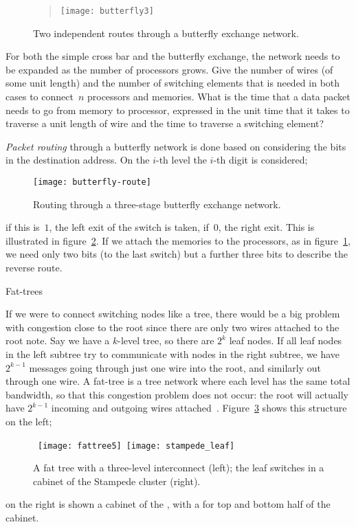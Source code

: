 \begin{figure}[ht]
  \begin{quote}
  \texttt{[image: butterfly3]}
  \end{quote}
  \caption{Two independent routes through a butterfly exchange network.}
  \label{fig:butterflyroute}
\end{figure}

\begin{exercise}
For both the simple cross bar and the butterfly
exchange, the network needs to be expanded as the number of processors grows. 
Give the number of wires (of some unit length) and the number of switching
elements that is needed in both cases to connect~$n$ processors and memories. 
What is the time that a data packet needs to go from memory to processor,
expressed in the unit time that it takes to traverse a unit length of wire
and the time to traverse a switching element?
\end{exercise}

\emph{Packet routing} through a butterfly
network is done based on considering the bits in the destination
address. On the $i$-th level the $i$-th digit is considered;
\begin{figure}[ht]
  \texttt{[image: butterfly-route]}
  \caption{Routing through a three-stage butterfly exchange network.}
  \label{fig:butterfly-route}
\end{figure}
if this is~$1$, the left exit of the switch is taken, if~$0$, the
right exit. This is illustrated in
figure~\ref{fig:butterfly-route}. If we attach the memories to the
processors, as in figure~\ref{fig:butterflyroute}, we need only two
bits (to the last switch) but a further
three bits to describe the reverse route.


 {Fat-trees}
\label{sec:fat-tree}

If we were to connect switching nodes like a tree, there would be a
big problem with congestion close to the root since there are only two
wires attached to the root note.  Say we have a $k$-level tree, so
there are $2^k$ leaf nodes.  If all leaf nodes in the left subtree try
to communicate with nodes in the right subtree, we have $2^{k-1}$
messages going through just one wire into the root, and similarly out
through one wire.  A fat-tree is a tree network where each level has
the same total bandwidth, so that this congestion problem does not
occur: the root will actually have $2^{k-1}$ incoming and outgoing
wires attached~\cite{Greenberg89randomizedrouting}.
Figure~\ref{fig:fattree} shows this structure on the left;
\begin{figure}
\hbox{%
  \texttt{[image: fattree5]}
  \kern20pt
  \texttt{[image: stampede\_leaf]}
}
  \caption{A fat tree with a three-level interconnect (left);
  the leaf switches in a cabinet of the Stampede cluster (right).}
  \label{fig:fattree}
\end{figure}
on the right is shown a cabinet of the ,
with a  for top and bottom half of the cabinet.

